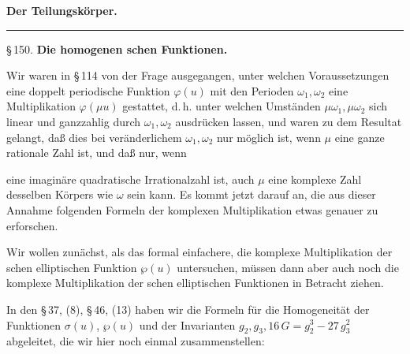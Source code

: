 
\begin{center}

{\Large \textbf{Der Teilungsk\"orper.}}
\end{center}

\begin{center}
\rule{2cm}{0.4pt}
\end{center}

\begin{center}
\S\,150. \textbf{Die homogenen schen Funktionen.}
\end{center}

Wir waren in \S\,114 von der Frage ausgegangen, unter welchen
Voraussetzungen eine doppelt periodische Funktion $\varphi(u)$ mit den
Perioden $\omega_1, \omega_2$ eine Multiplikation $\varphi(\mu u)$
gestattet, d.\,h. unter welchen Umst\"anden $\mu\omega_1, \mu\omega_2$
sich linear und ganzzahlig durch $\omega_1, \omega_2$ ausdr\"ucken
lassen, und waren zu dem Resultat gelangt, da\ss{} dies bei
ver\"anderlichem $\omega_1, \omega_2$ nur m\"oglich ist, wenn $\mu$ eine
ganze rationale Zahl ist, und da\ss{} nur, wenn


eine imagin\"are quadratische Irrationalzahl ist, auch $\mu$ eine
komplexe Zahl desselben K\"orpers wie $\omega$ sein kann. Es kommt
jetzt darauf an, die aus dieser Annahme folgenden Formeln der
komplexen Multiplikation etwas genauer zu erforschen.

Wir wollen zun\"achst, als das formal einfachere, die komplexe
Multiplikation der schen elliptischen Funktion $\wp(u)$
untersuchen, m\"ussen dann aber auch noch die komplexe Multiplikation
der schen elliptischen Funktionen in Betracht ziehen.

In den \S\,37, (8), \S\,46, (13) haben wir die Formeln f\"ur die
Homogeneit\"at der Funktionen $\sigma(u)$, $\wp(u)$ und der
Invarianten $g_2, g_3, 16\,G = g_2^3 - 27\,g_3^2$ abgeleitet, die wir
hier noch einmal zusammenstellen:

